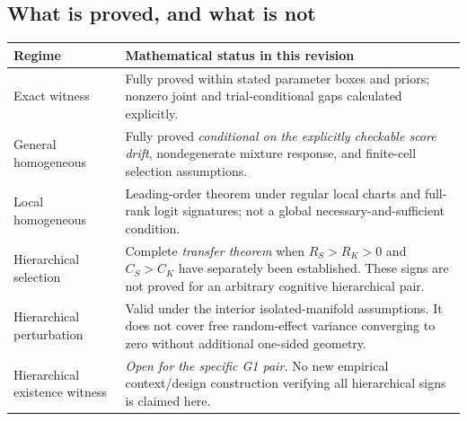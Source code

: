 \documentclass[11pt,letterpaper]{article}
\theoremstyle{plain}
\theoremstyle{definition}
\begin{document}
\subsection{What is proved, and what is not}
\begin{tabularx}{\textwidth}{@{}p{}X@{}}\toprule
\textbf{Regime} & \textbf{Mathematical status in this revision}\\\midrule
Exact witness & Fully proved within stated parameter boxes and priors; nonzero joint and trial-conditional gaps calculated explicitly.\\
General homogeneous & Fully proved \emph{conditional on the explicitly checkable score drift}, nondegenerate mixture response, and finite-cell selection assumptions.\\
Local homogeneous & Leading-order theorem under regular local charts and full-rank logit signatures; not a global necessary-and-sufficient condition.\\
Hierarchical selection & Complete \emph{transfer theorem} when $R_S>R_K>0$ and $C_S>C_K$ have separately been established. These signs are not proved for an arbitrary cognitive hierarchical pair.\\
Hierarchical perturbation & Valid under the interior isolated-manifold assumptions. It does not cover free random-effect variance converging to zero without additional one-sided geometry.\\
Hierarchical existence witness & \emph{Open for the specific G1 pair.} No new empirical context/design construction verifying all hierarchical signs is claimed here.\\\bottomrule
\end{tabularx}
\end{document}
